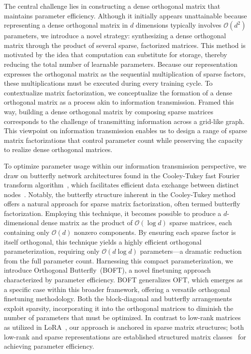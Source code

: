 The central challenge lies in constructing a dense orthogonal matrix that maintains parameter efficiency. Although it initially appears unattainable because representing a dense orthogonal matrix in $d$ dimensions typically involves $\mathcal{O}(d^2)$ parameters, we introduce a novel strategy: synthesizing a dense orthogonal matrix through the product of several sparse, factorized matrices. This method is motivated by the idea that computation can substitute for storage, thereby reducing the total number of learnable parameters. Because our representation expresses the orthogonal matrix as the sequential multiplication of sparse factors, these multiplications must be executed during every training cycle. To contextualize matrix factorization, we conceptualize the formation of a dense orthogonal matrix as a process akin to information transmission. Framed this way, building a dense orthogonal matrix by composing sparse matrices corresponds to the challenge of transmitting information across a grid-like graph. This viewpoint on information transmission enables us to design a range of sparse matrix factorizations that control parameter count while preserving the capacity to realize dense orthogonal matrices.

To optimize parameter usage within our information transmission perspective, we draw on butterfly network architectures found in the Cooley-Tukey fast Fourier transform algorithm~\cite{cooley1965algorithm}, which facilitates efficient data exchange between distinct nodes~\cite{klasing1994broadcasting}. Notably, the butterfly structure inherent in the Cooley-Tukey method offers a natural approach for sparse matrix factorization, often termed butterfly factorization. Employing this technique, it becomes possible to produce a $d$-dimensional dense matrix as the product of $\mathcal{O}(\log d)$ sparse matrices, each containing only $\mathcal{O}(d)$ nonzero components. By ensuring each sparse factor is itself orthogonal, this technique yields a highly efficient orthogonal parameterization, requiring only $\mathcal{O}(d \log d)$ parameters—a dramatic reduction from the full parameter count. Harnessing this compact parameterization, we introduce Orthogonal Butterfly~(BOFT), a novel finetuning approach characterized by parameter efficiency. BOFT generalizes OFT, which emerges as a specific case within this broader framework, offering a versatile orthogonal finetuning methodology. Both the block-diagonal and butterfly arrangements exploit sparsity, incorporating it into the orthogonal matrices to diminish the number of parameters that must be optimized. In contrast to low-rank matrices as utilized in LoRA~\cite{hulora2022}, our approach is anchored in sparse matrix structures; both low-rank and sparse representations are established structured matrix classes~\cite{candes2011robust} for achieving parameter efficiency.

